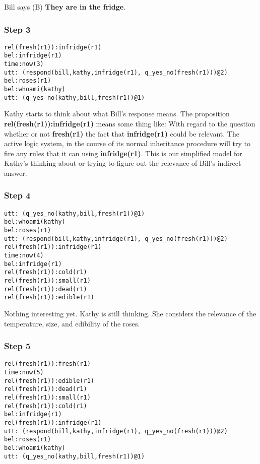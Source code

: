 \documentclass{article}
\begin{document}
Bill says (B) {\bf They are in the fridge}.


\subsubsection{Step 3}
\begin{verbatim}
rel(fresh(r1)):infridge(r1)
bel:infridge(r1)
time:now(3)
utt: (respond(bill,kathy,infridge(r1), q_yes_no(fresh(r1)))@2)
bel:roses(r1)
bel:whoami(kathy)
utt: (q_yes_no(kathy,bill,fresh(r1))@1)
\end{verbatim}

Kathy starts to think about what Bill's response means. The proposition {\bf
rel(fresh(r1)):infridge(r1)} means some thing like: With regard to the question
whether or not {\bf fresh(r1)} the fact that {\bf infridge(r1)} could be
relevant. The active logic system, in the course of its normal inheritance
procedure will try to fire any rules that it can using {\bf infridge(r1)}. This
is our simplified model for Kathy's thinking about or trying to figure out the
relevance of Bill's indirect answer.


\subsubsection{Step 4}

\begin{verbatim}
utt: (q_yes_no(kathy,bill,fresh(r1))@1)
bel:whoami(kathy)
bel:roses(r1)
utt: (respond(bill,kathy,infridge(r1), q_yes_no(fresh(r1)))@2)
rel(fresh(r1)):infridge(r1)
time:now(4)
bel:infridge(r1)
rel(fresh(r1)):cold(r1)
rel(fresh(r1)):small(r1)
rel(fresh(r1)):dead(r1)
rel(fresh(r1)):edible(r1)
\end{verbatim}

Nothing interesting yet. Kathy is still thinking. She considers the
relevance of the temperature, size, and edibility of the roses.

\subsubsection{Step 5}
\begin{verbatim}
rel(fresh(r1)):fresh(r1)
time:now(5)
rel(fresh(r1)):edible(r1)
rel(fresh(r1)):dead(r1)
rel(fresh(r1)):small(r1)
rel(fresh(r1)):cold(r1)
bel:infridge(r1)
rel(fresh(r1)):infridge(r1)
utt: (respond(bill,kathy,infridge(r1), q_yes_no(fresh(r1)))@2)
bel:roses(r1)
bel:whoami(kathy)
utt: (q_yes_no(kathy,bill,fresh(r1))@1)
\end{verbatim}
\end{document}
